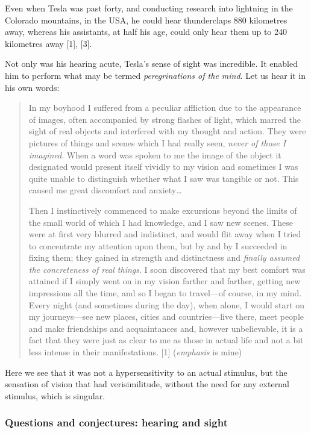 \documentclass[
  11pt,
  a4paper,
]{article}
\begin{document}
Even when Tesla was past forty, and conducting research into lightning
in the Colorado mountains, in the USA, he could hear thunderclaps 880
kilometres away, whereas his assistants, at half his age, could only
hear them up to 240 kilometres away {[}1{]}, {[}3{]}.

Not only was his hearing acute, Tesla's sense of sight was incredible.
It enabled him to perform what may be termed \emph{peregrinations of the
mind}. Let us hear it in his own words:

\begin{quote}
In my boyhood I suffered from a peculiar affliction due to the
appearance of images, often accompanied by strong flashes of light,
which marred the sight of real objects and interfered with my thought
and action. They were pictures of things and scenes which I had really
seen, \emph{never of those I imagined}. When a word was spoken to me the
image of the object it designated would present itself vividly to my
vision and sometimes I was quite unable to distinguish whether what I
saw was tangible or not. This caused me great discomfort and
anxiety\ldots{}

Then I instinctively commenced to make excursions beyond the limits of
the small world of which I had knowledge, and I saw new scenes. These
were at first very blurred and indistinct, and would flit away when I
tried to concentrate my attention upon them, but by and by I succeeded
in fixing them; they gained in strength and distinctness and
\emph{finally assumed the concreteness of real things}. I soon
discovered that my best comfort was attained if I simply went on in my
vision farther and farther, getting new impressions all the time, and so
I began to travel---of course, in my mind. Every night (and sometimes
during the day), when alone, I would start on my journeys---see new
places, cities and countries---live there, meet people and make
friendships and acquaintances and, however unbelievable, it is a fact
that they were just as clear to me as those in actual life and not a bit
less intense in their manifestations. {[}1{]} (\emph{emphasis} is mine)
\end{quote}

Here we see that it was not a hypersensitivity to an actual stimulus,
but the sensation of vision that had verisimilitude, without the need
for any external stimulus, which is singular.

\hypertarget{questions-and-conjectures-hearing-and-sight}{%
\subsubsection{Questions and conjectures: hearing and
sight}\label{questions-and-conjectures-hearing-and-sight}}
\end{document}
